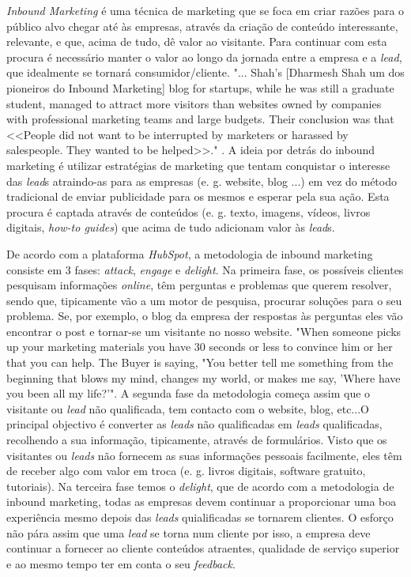 \textit{Inbound Marketing} é uma técnica de marketing que se foca em criar razões para o público alvo chegar até às empresas, através da criação de conteúdo interessante, relevante, e que, acima de tudo, dê valor ao visitante. Para continuar com esta procura é necessário manter o valor ao longo da jornada entre a empresa e a \textit{\gls{lead}}, que idealmente se tornará consumidor/cliente. "... Shah’s [Dharmesh Shah um dos pioneiros do Inbound Marketing] blog for startups, while he was still a graduate student, managed to attract more visitors than websites owned by companies with professional marketing teams and large budgets. Their conclusion was that <<People did not want to be interrupted by marketers or harassed by salespeople. They wanted to be helped>>."\cite{inbound_paper} . A ideia por detrás do inbound marketing é utilizar estratégias de marketing que tentam conquistar o interesse das \textit{\gls{lead}}s atraindo-as para as empresas (e. g. website, blog ...) em vez do método tradicional de enviar publicidade para os mesmos e esperar pela sua ação. Esta procura é captada através de conteúdos (e. g. texto, imagens, vídeos, livros digitais, \textit{how-to guides}) que acima de tudo adicionam valor às \textit{\gls{lead}}s.

De acordo com a plataforma \textit{HubSpot}\cite{HubSpot}, a metodologia de inbound marketing consiste em 3 fases: \textit{attack}, \textit{engage} e \textit{delight}. Na primeira fase, os possíveis clientes pesquisam informações \textit{online}, têm perguntas e problemas que querem resolver, sendo que, tipicamente vão a um motor de pesquisa, procurar soluções para o seu problema. Se, por exemplo, o blog da empresa der respostas às perguntas eles vão encontrar o post e tornar-se um visitante no nosso website.
 "When someone picks up your marketing materials you have 30 seconds or less to convince him or her that you can help. The Buyer is saying, "You better tell me something from the beginning that blows my mind, changes my world, or makes me say, 'Where have you been all my life?'"\cite{pbr}. 
A segunda fase da metodologia começa assim que o visitante ou \textit{lead} não qualificada, tem contacto com o website, blog, etc...O principal objectivo é converter as \textit{leads} não qualificadas em \textit{leads} qualificadas, recolhendo a sua informação, tipicamente, através de formulários. Visto que os visitantes ou \textit{leads} não fornecem as suas informações pessoais facilmente, eles têm de receber algo com valor em troca (e. g. livros digitais, software gratuito, tutoriais). 
Na terceira fase temos o \textit{delight}, que de acordo com a metodologia de inbound marketing, todas as empresas devem continuar a proporcionar uma boa experiência mesmo depois das \textit{leads} quialificadas se tornarem clientes. O esforço não pára assim que uma \textit{lead} se torna num cliente por isso, a empresa deve continuar a fornecer ao cliente conteúdos atraentes, qualidade de serviço superior e ao mesmo tempo ter em conta o seu \textit{feedback}. 

